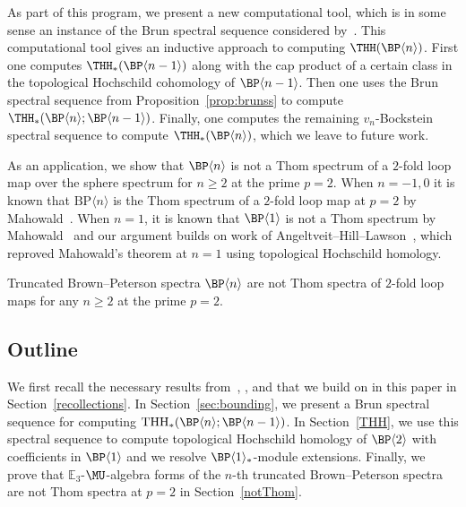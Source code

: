 As part of this program, we present a new computational tool, which is in some sense an instance of the Brun spectral sequence considered by~\cites{Bru00,Hon20}. This computational tool gives an inductive approach to computing $\THH(\BP\langle n\rangle)$. First one computes $\THH_*(\BP\langle n-1\rangle)$ along with the cap product of a certain class in the topological Hochschild cohomology of $\BP\langle n-1\rangle$. Then one uses the Brun spectral sequence from Proposition~\ref{prop:brunss} to compute $\THH_*(\BP\langle n\rangle;\BP\langle n-1\rangle)$.  Finally, one computes the remaining $v_{n}$-Bockstein spectral sequence to compute $\THH_*(\BP\langle n\rangle)$, which we leave to future work. 

As an application, we show that $\BP\langle n\rangle$ is not a Thom spectrum of a $2$-fold loop map over the sphere spectrum for $n\ge 2$ at the prime $p=2$. When $n=-1,0$ it is known that $\mathrm{BP}\langle n\rangle$ is the Thom spectrum of a $2$-fold loop map at $p=2$ by Mahowald~\cite{Mah79}. When $n=1$, it is known that $\BP\langle 1\rangle$ is not a Thom spectrum by Mahowald~\cite{Mah87} and our argument builds on work of Angeltveit--Hill--Lawson~\cite{AHL09}, which reproved Mahowald's theorem at $n=1$ using topological Hochschild homology. 
\begin{thmx}\label{thm:main-thom}
Truncated Brown--Peterson spectra $\BP\langle n\rangle$ are not Thom spectra of $2$-fold loop maps for any $n\ge 2$ at the prime $p=2$. 
\end{thmx}

\subsection{Outline}
We first recall the necessary results from~\cite{AHL10}, \cite{AR05}, and \cite{ACH24} that we build on in this paper in Section~\ref{recollections}. In Section~\ref{sec:bounding}, we present a Brun spectral sequence for computing $\mathrm{THH}_*(\BP\langle n\rangle ;\BP\langle n-1\rangle)$. In Section~\ref{THH}, we use this spectral sequence to compute topological Hochschild homology of $\BP\langle 2\rangle$ with coefficients in $\BP\langle 1\rangle$ and we resolve  $\BP\langle 1\rangle_*$-module extensions. Finally, we prove that $\mathbb{E}_3$-$\MU$-algebra forms of the $n$-th truncated Brown--Peterson spectra are not Thom spectra at $p=2$ in Section~\ref{notThom}. 

